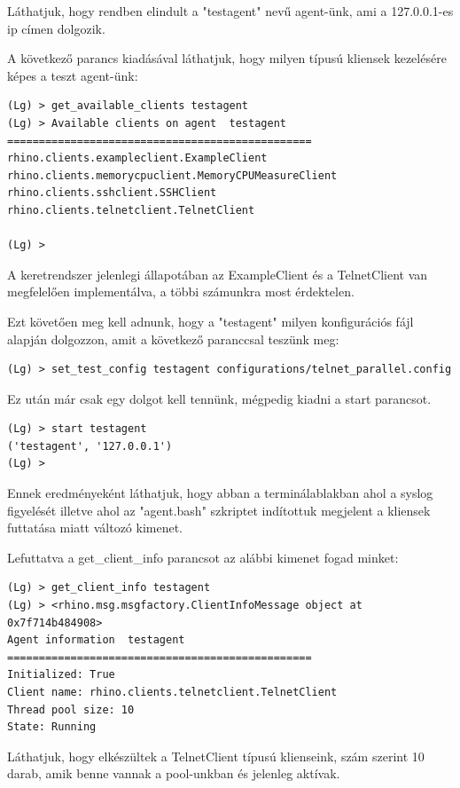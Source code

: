 \documentclass[a4paper,12pt,oneside]{report}
\begin{document}
\begin{enumerate}
\begin{lstlisting}
\end{lstlisting}

Láthatjuk, hogy rendben elindult a "testagent" nevű agent-ünk, ami a 127.0.0.1-es ip címen dolgozik.

A következő parancs kiadásával láthatjuk, hogy milyen típusú kliensek kezelésére képes a teszt agent-ünk:
\begin{lstlisting}
(Lg) > get_available_clients testagent
(Lg) > Available clients on agent  testagent
================================================
rhino.clients.exampleclient.ExampleClient
rhino.clients.memorycpuclient.MemoryCPUMeasureClient
rhino.clients.sshclient.SSHClient
rhino.clients.telnetclient.TelnetClient

(Lg) >

\end{lstlisting}

A keretrendszer jelenlegi állapotában az ExampleClient és a TelnetClient van megfelelően implementálva, a többi számunkra most érdektelen.

Ezt követően meg kell adnunk, hogy a "testagent" milyen konfigurációs fájl alapján dolgozzon, amit a következő paranccsal teszünk meg:
\begin{lstlisting}
(Lg) > set_test_config testagent configurations/telnet_parallel.config
\end{lstlisting}


Ez után már csak egy dolgot kell tennünk, mégpedig kiadni a start parancsot.
\begin{lstlisting}
(Lg) > start testagent
('testagent', '127.0.0.1')
(Lg) >
\end{lstlisting}

Ennek eredményeként láthatjuk, hogy abban a terminálablakban ahol a syslog figyelését illetve ahol az "agent.bash" szkriptet indítottuk megjelent a kliensek futtatása miatt változó kimenet.

Lefuttatva a get\_client\_info parancsot az alábbi kimenet fogad minket:
\begin{lstlisting}
(Lg) > get_client_info testagent
(Lg) > <rhino.msg.msgfactory.ClientInfoMessage object at 0x7f714b484908>
Agent information  testagent
================================================
Initialized: True
Client name: rhino.clients.telnetclient.TelnetClient
Thread pool size: 10
State: Running

\end{lstlisting}

Láthatjuk, hogy elkészültek a TelnetClient típusú klienseink, szám szerint 10 darab, amik benne vannak a pool-unkban és jelenleg aktívak.


\end{enumerate}
\end{document}
